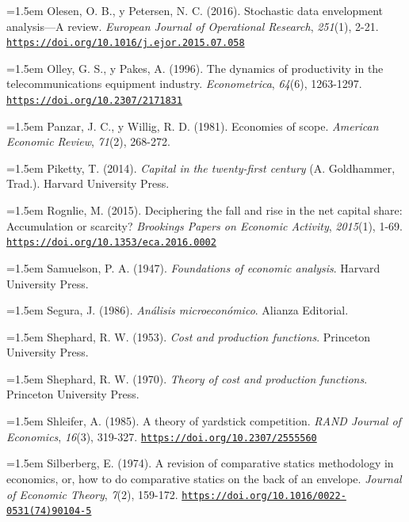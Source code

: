 \documentclass[10pt,a4paper]{article}
\begin{document}
\noindent\hangindent=1.5em Olesen, O. B., y Petersen, N. C. (2016). Stochastic data envelopment analysis---A review. \textit{European Journal of Operational Research}, \textit{251}(1), 2-21. \href{https://doi.org/10.1016/j.ejor.2015.07.058}{\nolinkurl{https://doi.org/10.1016/j.ejor.2015.07.058}}

\noindent\hangindent=1.5em Olley, G. S., y Pakes, A. (1996). The dynamics of productivity in the telecommunications equipment industry. \textit{Econometrica}, \textit{64}(6), 1263-1297. \href{https://doi.org/10.2307/2171831}{\nolinkurl{https://doi.org/10.2307/2171831}}

\noindent\hangindent=1.5em Panzar, J. C., y Willig, R. D. (1981). Economies of scope. \textit{American Economic Review}, \textit{71}(2), 268-272.

\noindent\hangindent=1.5em Piketty, T. (2014). \textit{Capital in the twenty-first century} (A. Goldhammer, Trad.). Harvard University Press.

\noindent\hangindent=1.5em Rognlie, M. (2015). Deciphering the fall and rise in the net capital share: Accumulation or scarcity? \textit{Brookings Papers on Economic Activity}, \textit{2015}(1), 1-69. \href{https://doi.org/10.1353/eca.2016.0002}{\nolinkurl{https://doi.org/10.1353/eca.2016.0002}}

\noindent\hangindent=1.5em Samuelson, P. A. (1947). \textit{Foundations of economic analysis}. Harvard University Press.

\noindent\hangindent=1.5em Segura, J. (1986). \textit{Análisis microeconómico}. Alianza Editorial.

\noindent\hangindent=1.5em Shephard, R. W. (1953). \textit{Cost and production functions}. Princeton University Press.

\noindent\hangindent=1.5em Shephard, R. W. (1970). \textit{Theory of cost and production functions}. Princeton University Press.

\noindent\hangindent=1.5em Shleifer, A. (1985). A theory of yardstick competition. \textit{RAND Journal of Economics}, \textit{16}(3), 319-327. \href{https://doi.org/10.2307/2555560}{\nolinkurl{https://doi.org/10.2307/2555560}}

\noindent\hangindent=1.5em Silberberg, E. (1974). A revision of comparative statics methodology in economics, or, how to do comparative statics on the back of an envelope. \textit{Journal of Economic Theory}, \textit{7}(2), 159-172. \href{https://doi.org/10.1016/0022-0531(74)90104-5}{\nolinkurl{https://doi.org/10.1016/0022-0531(74)90104-5}}
\end{document}
